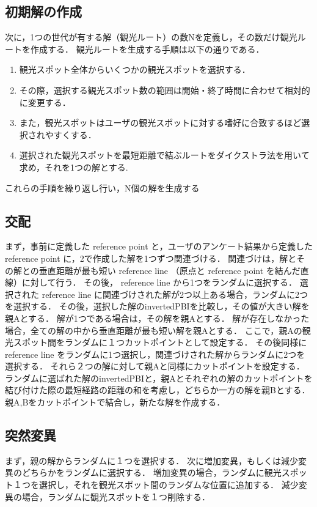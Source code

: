 \subsection{初期解の作成}\label{sec:初期解の作成}
次に，1つの世代が有する解（観光ルート）の数Nを定義し，その数だけ観光ルートを作成する．
観光ルートを生成する手順は以下の通りである．
\begin{enumerate}
    \item 観光スポット全体からいくつかの観光スポットを選択する．
    \item その際，選択する観光スポット数の範囲は開始・終了時間に合わせて相対的に変更する．
    \item また，観光スポットはユーザの観光スポットに対する嗜好に合致するほど選択されやすくする．
    \item 選択された観光スポットを最短距離で結ぶルートをダイクストラ法を用いて求め，それを1つの解とする.
\end{enumerate}
これらの手順を繰り返し行い，N個の解を生成する

\subsection{交配}\label{sec:交配}
まず，事前に定義した reference point と，ユーザのアンケート結果から定義した reference point に，2で作成した解を1つずつ関連づける．
関連づけは，解とその解との垂直距離が最も短い reference line （原点と reference point を結んだ直線）に対して行う．
その後， reference line から1つをランダムに選択する．
選択された reference line に関連づけされた解が2つ以上ある場合，ランダムに2つを選択する．
その後，選択した解のinvertedPBIを比較し，その値が大きい解を親Aとする．
解が1つである場合は，その解を親Aとする．
解が存在しなかった場合，全ての解の中から垂直距離が最も短い解を親Aとする．	
ここで，親Aの観光スポット間をランダムに１つカットポイントとして設定する．
その後同様に reference line をランダムに1つ選択し，関連づけされた解からランダムに2つを選択する．
それら２つの解に対して親Aと同様にカットポイントを設定する．
ランダムに選ばれた解のinvertedPBIと，親Aとそれぞれの解のカットポイントを結び付けた際の最短経路の距離の和を考慮し，どちらか一方の解を親Bとする．
親A,Bをカットポイントで結合し，新たな解を作成する．

\subsection{突然変異}\label{sec:突然変異}
まず，親の解からランダムに１つを選択する．
次に増加変異，もしくは減少変異のどちらかをランダムに選択する．
増加変異の場合，ランダムに観光スポット１つを選択し，それを観光スポット間のランダムな位置に追加する．
減少変異の場合，ランダムに観光スポットを１つ削除する．

